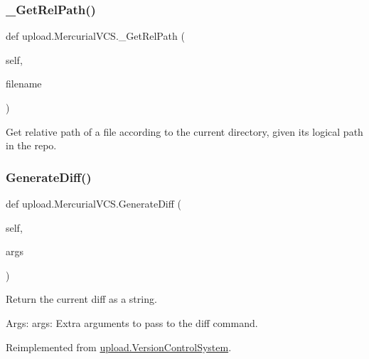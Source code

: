 \subsubsection{\texorpdfstring{\_GetRelPath()}{\_GetRelPath()}\hspace{0.1cm}{\footnotesize\ttfamily [2/2]}}
{\footnotesize\ttfamily def upload.\+Mercurial\+V\+C\+S.\+\_\+\+Get\+Rel\+Path (\begin{DoxyParamCaption}\item[{}]{self,  }\item[{}]{filename }\end{DoxyParamCaption})\hspace{0.3cm}{\ttfamily [private]}}

\begin{DoxyVerb}Get relative path of a file according to the current directory,
given its logical path in the repo.\end{DoxyVerb}
 \mbox{\label{classupload_1_1_mercurial_v_c_s_a6c05746012d8cd435c94ace1465671ef}} 
\subsubsection{\texorpdfstring{GenerateDiff()}{GenerateDiff()}\hspace{0.1cm}{\footnotesize\ttfamily [1/2]}}
{\footnotesize\ttfamily def upload.\+Mercurial\+V\+C\+S.\+Generate\+Diff (\begin{DoxyParamCaption}\item[{}]{self,  }\item[{}]{args }\end{DoxyParamCaption})}

\begin{DoxyVerb}Return the current diff as a string.

Args:
  args: Extra arguments to pass to the diff command.
\end{DoxyVerb}
 

Reimplemented from \mbox{\hyperlink{classupload_1_1_version_control_system_aa5eb260c96e7016dab36b5fc136c9f49}{upload.\+Version\+Control\+System}}.

\mbox{\label{classupload_1_1_mercurial_v_c_s_a6c05746012d8cd435c94ace1465671ef}} 
